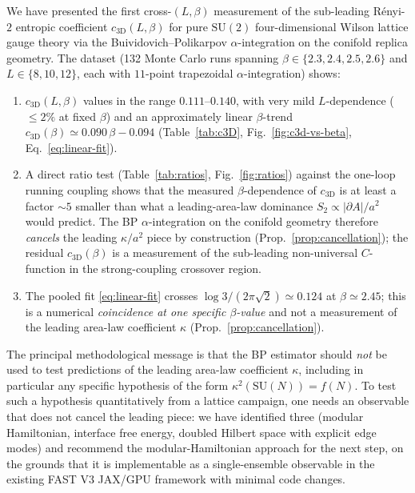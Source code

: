 \documentclass[11pt,a4paper]{article}
\theoremstyle{definition}
\newcommand{\SUtwo}{\mathrm{SU}(2)}
\newcommand{\SUN}{\mathrm{SU}(N)}
\newcommand{\threeD}{{3\text{D}}}
\begin{document}
We have presented the first cross-$(L,\beta)$ measurement of the
sub-leading Rényi-$2$ entropic coefficient $c_{\threeD}(L,\beta)$ for
pure $\SUtwo$ four-dimensional Wilson lattice gauge theory via the
Buividovich--Polikarpov $\alpha$-integration on the conifold replica
geometry. The dataset (132 Monte Carlo runs spanning
$\beta\in\{2.3,2.4,2.5,2.6\}$ and $L\in\{8,10,12\}$, each with
$11$-point trapezoidal $\alpha$-integration) shows:
\begin{enumerate}[leftmargin=*]
\item $c_{\threeD}(L,\beta)$ values in the range $0.111$--$0.140$,
      with very mild $L$-dependence ($\le 2\%$ at fixed $\beta$) and
      an approximately linear $\beta$-trend
      $c_{\threeD}(\beta)\simeq 0.090\,\beta - 0.094$
      (Table~\ref{tab:c3D}, Fig.~\ref{fig:c3d-vs-beta},
      Eq.~\eqref{eq:linear-fit}).
\item A direct ratio test (Table~\ref{tab:ratios},
      Fig.~\ref{fig:ratios}) against the one-loop running
      coupling shows that the measured $\beta$-dependence of
      $c_{\threeD}$ is at least a factor $\sim\!5$ smaller than what
      a leading-area-law dominance $S_{2}\propto |\partial A|/a^{2}$
      would predict. The BP $\alpha$-integration on the conifold
      geometry therefore \emph{cancels} the leading $\kappa/a^{2}$
      piece by construction (Prop.~\ref{prop:cancellation}); the
      residual $c_{\threeD}(\beta)$ is a measurement of the
      sub-leading non-universal $C$-function in the strong-coupling
      crossover region.
\item The pooled fit \eqref{eq:linear-fit} crosses $\log
      3/(2\pi\sqrt 2)\simeq 0.124$ at $\beta\simeq 2.45$; this is
      a numerical \emph{coincidence at one specific $\beta$-value}
      and not a measurement of the leading area-law coefficient
      $\kappa$ (Prop.~\ref{prop:cancellation}).
\end{enumerate}

The principal methodological message is that the BP estimator
should \emph{not} be used to test predictions of the leading
area-law coefficient $\kappa$, including in particular any
specific hypothesis of the form $\kappa^{2}(\SUN) = f(N)$. To test
such a hypothesis quantitatively from a lattice campaign, one needs
an observable that does not cancel the leading piece: we have
identified three (modular Hamiltonian, interface free energy,
doubled Hilbert space with explicit edge modes) and recommend the
modular-Hamiltonian approach for the next step, on the grounds that
it is implementable as a single-ensemble observable in the existing
FAST V3 JAX/GPU framework with minimal code changes.
\end{document}
